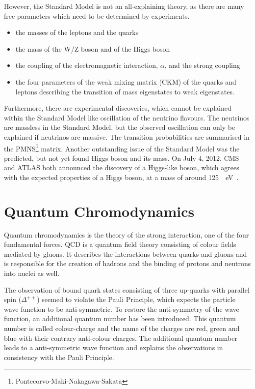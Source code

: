 However, the Standard Model is not an all-explaining theory, as there are many
free parameters which need to be determined by experiments.

\begin{itemize}
\item{the masses of the leptons and the quarks}
\item{the mass of the W/Z boson and of the Higgs boson}
\item{the coupling of the electromagnetic interaction, $\alpha$, and the strong coupling \as}
\item{the four parameters of the weak mixing matrix (CKM) of the quarks and leptons describing the transition of mass eigenstates to weak eigenstates.}
\end{itemize}

Furthermore, there are experimental discoveries, which cannot be explained
within the Standard Model like oscillation of the neutrino flavours. The
neutrinos are massless in the Standard Model, but the observed oscillation can
only be explained if neutrinos are massive. The transition probabilities are
summarised in the PMNS\footnote{Pontecorvo-Maki-Nakagawa-Sakata} matrix. Another
outstanding issue of the Standard Model was the predicted, but not yet found
Higgs boson and its mass. On July 4, 2012, CMS and ATLAS both announced the
discovery of a Higgs-like boson, which agrees with the expected properties of a
Higgs boson, at a mass of around \SI{125}{\giga
\electronvolt}~\cite{:2012gk,:2012gu}.

\section{Quantum Chromodynamics}

Quantum chromodynamics is the theory of the strong interaction, one of the four fundamental forces. QCD  is a quantum field theory consisting of colour fields mediated by gluons. It describes the interactions between quarks and gluons and is responsible for the creation of hadrons and the binding of protons and neutrons into nuclei as well.

The observation of bound quark states consisting of three up-quarks with parallel spin ($\Delta^{++}$) seemed to violate the Pauli Principle, which expects the particle wave function to be anti-symmetric. To restore the anti-symmetry of the wave function, an additional quantum number has been introduced. This quantum number is called colour-charge and the name of the charges are red, green and blue with their contrary anti-colour charges. The additional quantum number leads to a anti-symmetric wave function and explains the observations in consistency with the Pauli Principle.

